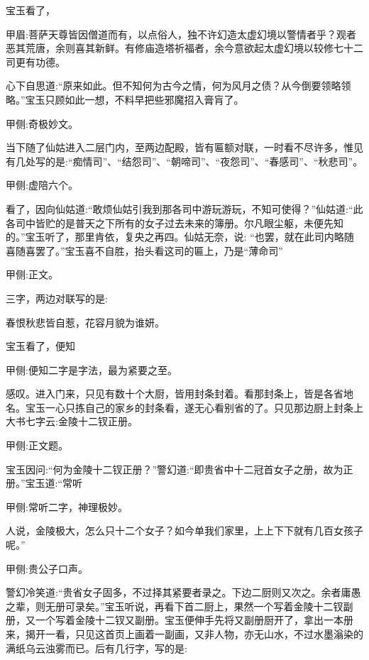 \begin{parag}
    宝玉看了，\begin{note}甲眉:菩萨天尊皆因僧道而有，以点俗人，独不许幻造太虚幻境以警情者乎？观者恶其荒唐，余则喜其新鲜。有修庙造塔祈福者，余今意欲起太虚幻境以较修七十二司更有功德。\end{note}心下自思道:“原来如此。但不知何为古今之情，何为风月之债？从今倒要领略领略。”宝玉只顾如此一想，不料早把些邪魔招入膏肓了。\begin{note}甲侧:奇极妙文。\end{note}当下随了仙姑进入二层门内，至两边配殿，皆有匾额对联，一时看不尽许多，惟见有几处写的是:“痴情司”、“结怨司”、“朝啼司”、“夜怨司”、“春感司”、“秋悲司”。\begin{note}甲侧:虚陪六个。\end{note}看了，因向仙姑道:“敢烦仙姑引我到那各司中游玩游玩，不知可使得？”仙姑道:“此各司中皆贮的是普天之下所有的女子过去未来的簿册。尔凡眼尘躯，未便先知的。”宝玉听了，那里肯依，复央之再四。仙姑无奈，说: “也罢，就在此司内略随喜随喜罢了。”宝玉喜不自胜，抬头看这司的匾上，乃是“薄命司”\begin{note}甲侧:正文。\end{note}三字，两边对联写的是:
\end{parag}


\begin{poem}\begin{pl}春恨秋悲皆自惹，花容月貌为谁妍。\end{pl}\end{poem}


\begin{parag}
    宝玉看了，便知\begin{note}甲侧:便知二字是字法，最为紧要之至。\end{note}感叹。进入门来，只见有数十个大厨，皆用封条封着。看那封条上，皆是各省地名。宝玉一心只拣自己的家乡的封条看，遂无心看别省的了。只见那边厨上封条上大书七字云:金陵十二钗正册。\begin{note}甲侧:正文题。\end{note}宝玉因问:“何为金陵十二钗正册？”警幻道:“即贵省中十二冠首女子之册，故为正册。”宝玉道:“常听\begin{note}甲侧:常听二字，神理极妙。\end{note}人说，金陵极大，怎么只十二个女子？如今单我们家里，上上下下就有几百女孩子呢。”\begin{note}甲侧:贵公子口声。\end{note}警幻冷笑道:“贵省女子固多，不过择其紧要者录之。下边二厨则又次之。余者庸愚之辈，则无册可录矣。”宝玉听说，再看下首二厨上，果然一个写着金陵十二钗副册，又一个写着金陵十二钗又副册。宝玉便伸手先将又副册厨开了，拿出一本册来，揭开一看，只见这首页上画着一副画，又非人物，亦无山水，不过水墨滃染的满纸乌云浊雾而已。后有几行字，写的是:
\end{parag}


